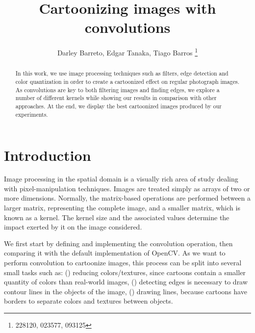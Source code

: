 \documentclass[]{IEEEtran}
\begin{document}
  \title{Cartoonizing images with convolutions}
  \author{Darley Barreto, Edgar Tanaka, Tiago Barros
    \thanks{228120, 023577, 093125}
  }
  \maketitle
  
  \begin{abstract}


    In this work, we use image processing techniques such as filters, edge detection and color quantization in order to
    create a cartoonized effect on regular photograph images.
    As convolutions are key to both filtering images and finding edges, we explore a number of different kernels
    while showing our results in comparison with other approaches.
    At the end, we display the best cartoonized images produced by our experiments.
  \end{abstract}
  
  \section{Introduction}
  Image processing in the spatial domain is a visually rich area of study dealing with pixel-manipulation techniques.
  Images are treated simply as arrays of two or more dimensions.
  Normally, the matrix-based operations are performed between a larger matrix, representing the complete image,
  and a smaller matrix, which is known as a kernel. The kernel size and the associated values determine the
  impact exerted by it on the image considered.
  
  We first start by defining and implementing the convolution operation,
  then comparing it with the default implementation of OpenCV.
  As we want to perform convolution to cartoonize images, this process can be split into several small tasks
  such as:
  () reducing colors/textures, since cartoons contain a smaller quantity of colors than real-world images,
  () detecting edges is necessary to draw contour lines in the objects of the image,
  () drawing lines, because cartoons have borders to separate colors and textures between objects.
\end{document}
